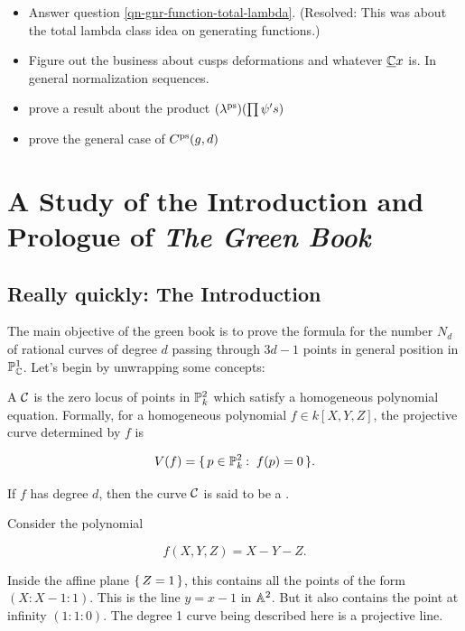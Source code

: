 \documentclass[12pt]{memoir}
\begin{document}
{\begin{itemize}
          \[0\to TX\to f^\ast TY\to\quot{f^\ast TY}{TX}\to 0\]

          is an exact sequence. Here \(TX\) denotes \(X\)'s tangent sheaf. Find enough conditions on \(f\) which guarantee that this sequence is indeed exact.
    \item Answer question \ref{qn-gnr-function-total-lambda}. (Resolved: This was about the total lambda class idea on generating functions.)
\end{itemize}
\begin{itemize}
    \item Figure out the business about cusps deformations and whatever \(\underline{\mathbb{C}}x\) is. In general normalization sequences.
    \item prove a result about the product \((\lambda^{\operatorname{\mathrm{ps}}})(\prod\psi's)\)
    \item prove the general case of \(C^{\operatorname{\mathrm{ps}}}(g,d)\)
\end{itemize}
}
\newpage
\tableofcontents
\chapter{A Study of the Introduction and Prologue of \emph{The Green Book}}

\section{Really quickly: The Introduction}

The main objective of the green book is to prove the formula for the number \(N_d\) of rational curves of degree \(d\) passing through \(3d-1\) points in general position in \(\mathbb{P}_{\mathbb{C}}^1\). Let's begin by unwrapping some concepts:

\begin{Def}
    A  \(\mathcal{C}\) is the zero locus of points in \(\mathbb{P}^2_k\) which satisfy a homogeneous polynomial equation. Formally, for a homogeneous polynomial \(f\in k[X,Y,Z]\), the projective curve determined by \(f\) is

    \[V(f)=\set{p\in\bP^2_k\:\ f(p)=0}.\]

    If \(f\) has degree \(d\), then the curve \(\mathcal{C}\) is said to be a .
\end{Def}

\begin{Ex}
    Consider the polynomial

    \[f(X,Y,Z)=X-Y-Z.\]

    Inside the affine plane \(\{\,Z=1\,\}\), this contains all the points of the form \((X:X-1:1)\). This is the line \(y=x-1\) in \(\mathbb{A}^2\). But it also contains the point at infinity \((1:1:0)\). The degree 1 curve being described here is a projective line.
\end{Ex}
\end{document}
